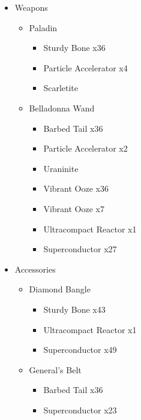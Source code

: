 \begin{upgrade}
	\begin{itemize}
		\item Weapons
			\begin{itemize}
				\item Paladin
					\begin{itemize}
						\item Sturdy Bone x36
						\item Particle Accelerator x4
						\item Scarletite
					\end{itemize}
				\item Belladonna Wand
					\begin{itemize}
						\item Barbed Tail x36
						\item Particle Accelerator x2
						\item Uraninite
						\item Vibrant Ooze x36
						\item Vibrant Ooze x7
						\item Ultracompact Reactor x1
						\item Superconductor x27						
					\end{itemize}
			\end{itemize}
		\item Accessories
			\begin{itemize}
				\item Diamond Bangle
					\begin{itemize}
						\item Sturdy Bone x43
						\item Ultracompact Reactor x1
						\item Superconductor x49
					\end{itemize}
				\item General's Belt
					\begin{itemize}
						\item Barbed Tail x36
						\item Superconductor x23
					\end{itemize}							
			\end{itemize}
	\end{itemize}
\end{upgrade}

